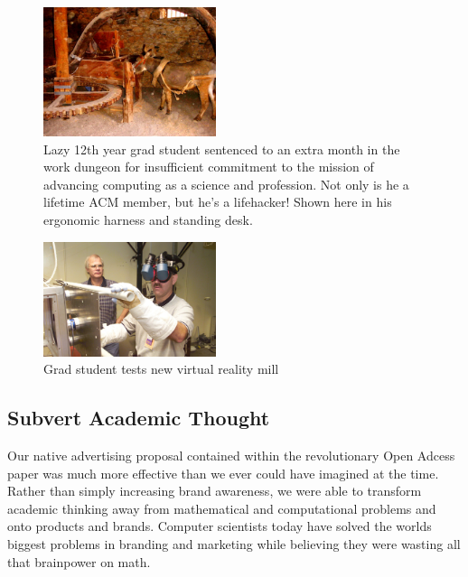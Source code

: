 \begin{figure}
  \centering
  \includegraphics[width=0.45\textwidth]{figures/horse-mill.jpg}
  \caption{Lazy 12th year grad student sentenced to an extra
  month in the work dungeon for insufficient commitment to the mission of advancing
computing as a science and profession.
Not only is he a lifetime ACM member, but he's a lifehacker!  Shown here in his
ergonomic harness and standing desk.}
  \label{fig:horse-mill}
\end{figure}

\begin{figure}
  \centering
  \includegraphics[width=0.45\textwidth]{figures/future-mill.jpg}
  \caption{Grad student tests new virtual reality mill}
  \label{fig:vr-mill}
\end{figure}

\subsection{Subvert Academic Thought}
Our native advertising proposal contained within the revolutionary Open Adcess
\cite{this} paper was much more effective than we ever could have imagined at
the time.
Rather than simply increasing brand awareness, we were able to transform
academic thinking away from mathematical and computational problems and
onto products and brands.
Computer scientists today have solved the worlds biggest problems in branding
and marketing while believing they were wasting all that brainpower on math.

